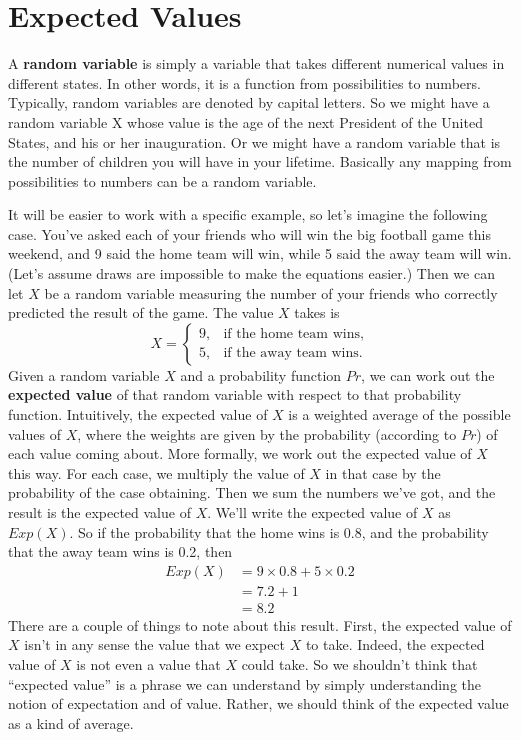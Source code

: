 \section{Expected Values}
A \textbf{random variable} is simply a variable that takes different numerical values in different states. In other words, it is a function from possibilities to numbers. Typically, random variables are denoted by capital letters. So we might have a random variable X whose value is the age of the next President of the United States, and his or her inauguration. Or we might have a random variable that is the number of children you will have in your lifetime. Basically any mapping from possibilities to numbers can be a random variable. 

It will be easier to work with a specific example, so let's imagine the following case. You've asked each of your friends who will win the big football game this weekend, and 9 said the home team will win, while 5 said the away team will win. (Let's assume draws are impossible to make the equations easier.) Then we can let $X$ be a random variable measuring the number of your friends who correctly predicted the result of the game. The value $X$ takes is
\begin{equation*}
X = \begin{cases}9,& \text{if the home team wins} ,\\ 5,& \text{if the away team wins} .\end{cases}
\end{equation*}
Given a random variable $X$ and a probability function $Pr$, we can work out the \textbf{expected value} of that random variable with respect to that probability function. Intuitively, the expected value of $X$ is a weighted average of the possible values of $X$, where the weights are given by the probability (according to $Pr$) of each value coming about. More formally, we work out the expected value of $X$ this way. For each case, we multiply the value of $X$ in that case by the probability of the case obtaining. Then we sum the numbers we've got, and the result is the expected value of $X$. We'll write the expected value of $X$ as $Exp(X)$. So if the probability that the home wins is 0.8, and the probability that the away team wins is 0.2, then
\begin{align*}
Exp(X) &= 9 \times 0.8 + 5 \times 0.2 \\
 &= 7.2 + 1 \\
 &= 8.2
\end{align*} There are a couple of things to note about this result. First, the expected value of $X$ isn't in any sense the value that we expect $X$ to take. Indeed, the expected value of $X$ is not even a value that $X$ could take. So we shouldn't think that ``expected value'' is a phrase we can understand by simply understanding the notion of expectation and of value. Rather, we should think of the expected value as a kind of average.

